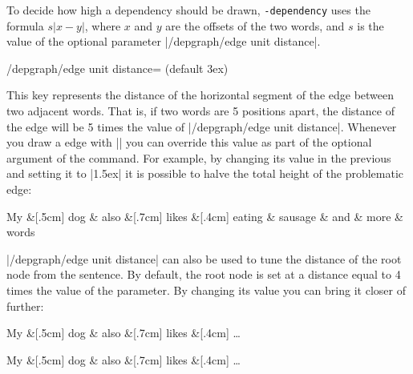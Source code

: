 \documentclass[a4paper]{ltxdoc}
\def\pkgname{\tikzname{}\texttt{-dependency}}
\begin{document}
To decide how high a dependency should be drawn, \pkgname{} uses the formula $s\vert x-y \vert$, where $x$ and $y$ are the offsets of the two words, and $s$ is the value of the optional parameter |/depgraph/edge unit distance|.

\begin{key}{/depgraph/edge unit distance= (default 3ex)}

   This key represents the distance of the horizontal segment of the edge between two adjacent words. That is, if two words are 5 positions apart, the distance of the edge will be 5 times the value of |/depgraph/edge unit distance|.  Whenever you draw a edge with |\depedge| you can override this value as part of the optional argument of the command. For example, by changing its value in the previous and setting it to |1.5ex| it is possible to halve the total height of the problematic edge:

\begin{codeexample}[]
\begin{dependency}
   \begin{deptext}[column sep=0.2cm]
      My \&[.5cm] dog \& also \&[.7cm] likes \&[.4cm] eating \& sausage \& and \& more \& words \\
   \end{deptext}
\end{dependency}
\end{codeexample}

|/depgraph/edge unit distance| can also be used to tune the distance of the root node from the sentence. By default, the root node is set at a distance equal to 4 times the value of the parameter. By changing its value you can bring it closer of further:

\begin{codeexample}[]
\begin{dependency}
   \begin{deptext}[column sep=0.2cm]
      My \&[.5cm] dog \& also \&[.7cm] likes \&[.4cm] \dots \\
   \end{deptext}
\end{dependency} 
\quad
\begin{dependency}
   \begin{deptext}[column sep=0.2cm]
      My \&[.5cm] dog \& also \&[.7cm] likes \&[.4cm] \dots \\
   \end{deptext}
\end{dependency}
\end{codeexample}

\end{key}
\end{document}
